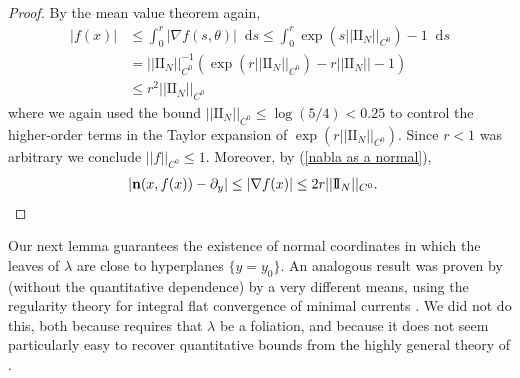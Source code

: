 \documentclass[reqno,11pt]{amsart}
\newcommand*\dif{\mathop{}\!\mathrm{d}}
\newcommand{\Two}{\mathrm{I\!I}}
\newcommand{\normal}{\mathbf n}
\theoremstyle{definition}
\numberwithin{equation}{section}
\begin{document}
\begin{proof}
	By the mean value theorem again,
\begin{align*}
	|f(x)| &\leq \int_0^r |\nabla f(s, \theta)| \dif s \leq \int_0^r \exp(s ||\Two_N||_{C^0}) - 1 \dif s \\
	&= ||\Two_N||_{C^0}^{-1} (\exp(r ||\Two_N||_{C^0}) - r||\Two_N|| - 1) \\
	&\leq r^2 ||\Two_N||_{C^0}
\end{align*}
	where we again used the bound $||\Two_N||_{C^0} \leq \log(5/4) < 0.25$ to control the higher-order terms in the Taylor expansion of $\exp(r ||\Two_N||_{C^0})$. Since $r < 1$ was arbitrary we conclude $||f||_{C^0} \leq 1$. Moreover, by (\ref{nabla as a normal}),
\begin{align*}
	|\normal(x, f(x)) - \partial_y| &\leq |\nabla f(x)| \leq 2r ||\Two_N||_{C^0}. \qedhere
\end{align*}
\end{proof}

Our next lemma guarantees the existence of normal coordinates in which the leaves of $\lambda$ are close to hyperplanes $\{y = y_0\}$.
An analogous result was proven by \cite{Solomon86} (without the quantitative dependence) by a very different means, using the regularity theory for integral flat convergence of minimal currents \cite[Theorem 5.3.14]{federer2014geometric}.
We did not do this, both because \cite{Solomon86} requires that $\lambda$ be a foliation, and because it does not seem particularly easy to recover quantitative bounds from the highly general theory of \cite[Chapter 5]{federer2014geometric}.
\end{document}
